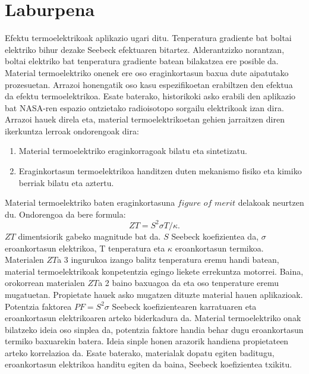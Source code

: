 
\chapter*{Laburpena} %

Efektu termoelektrikoak aplikazio ugari ditu. Tenperatura gradiente bat boltai elektriko bihur dezake Seebeck 
efektuaren bitartez. Alderantzizko norantzan, boltai elektriko bat tenperatura gradiente batean bilakatzea ere 
posible da. Material termoelektriko onenek ere oso eraginkortasun baxua dute aipatutako prozesuetan. Arrazoi 
honengatik oso kasu espezifikoetan erabiltzen den efektua da efektu termoelektrikoa. Esate baterako, historikoki 
asko erabili den aplikazio bat NASA-ren espazio ontzietako radioisotopo sorgailu 
elektrikoak\cite{yang2006thermoelectric} izan dira. Arrazoi hauek direla eta, material termoelektrikoetan gehien 
jarraitzen diren ikerkuntza lerroak ondorengoak dira:
\begin{enumerate}
\item Material termoelektriko eraginkorragoak bilatu eta sintetizatu.
\item Eraginkortasun termoelektrikoa handitzen duten mekanismo fisiko eta kimiko berriak bilatu eta aztertu. 
\end{enumerate}
Material termoelektriko baten eraginkortasuna $figure$ $of$ $merit$ delakoak neurtzen du. Ondorengoa da bere formula:
\begin{equation}
\nonumber
ZT=S^{2}\sigma T/\kappa.
\end{equation}
$ZT$ dimentsiorik gabeko magnitude bat da. $S$ Seebeck koefizientea da, $\sigma$ eroankortasun elektrikoa, T 
tenperatura eta $\kappa$ eroankortasun termikoa. Materialen $ZT$a 3 ingurukoa izango balitz tenperatura eremu handi 
batean, material termoelektrikoak konpetentzia egingo liekete errekuntza motorrei\cite{zhang2015thermoelectric}. 
Baina, orokorrean materialen $ZT$a 2 baino baxuagoa da eta oso tenperature eremu mugatuetan. Propietate hauek asko 
mugatzen dituzte material hauen aplikazioak. \\

Potentzia faktorea $PF=S^{2}\sigma$ Seebeck koefizientearen karratuaren eta eroankortasun elektrikoaren arteko
biderkadura da. Material termoelektriko onak bilatzeko ideia oso sinplea da, potentzia faktore handia behar dugu 
eroankortasun termiko baxuarekin batera. Ideia sinple honen arazorik handiena propietateen arteko korrelazioa da. 
Esate baterako, materialak dopatu egiten baditugu, eroankortasun elektrikoa handitu egiten da baina, Seebeck 
koefizientea txikitu. \\

